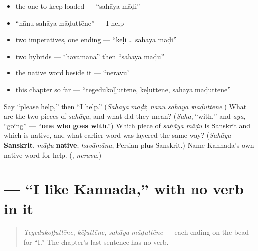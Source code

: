 \begin{itemize}
\raggedright
  \item the one to keep loaded — \textquotedblleft{}sahāya māḍi\textquotedblright{}
  \item \textquotedblleft{}nānu sahāya māḍuttēne\textquotedblright{} — I help
  \item two imperatives, one ending — \textquotedblleft{}kēḷi … sahāya māḍi\textquotedblright{}
  \item two hybrids — \textquotedblleft{}havāmāna\textquotedblright{} then \textquotedblleft{}sahāya māḍu\textquotedblright{}
  \item the native word beside it — \textquotedblleft{}neravu\textquotedblright{}
  \item this chapter so far — \textquotedblleft{}tegedukoḷḷuttēne, kēḷuttēne, sahāya māḍuttēne\textquotedblright{}
\end{itemize}

\begin{tcolorbox}[breakable,colback=teal!4,colframe=teal!35!black,title={Before you move on}]
Say \textquotedblleft{}please help,\textquotedblright{} then \textquotedblleft{}I help.\textquotedblright{} (\emph{Sahāya māḍi}; \emph{nānu sahāya māḍuttēne}.) What are the two pieces of \emph{sahāya}, and what did they mean? (\emph{Saha}, \textquotedblleft{}with,\textquotedblright{} and \emph{aya}, \textquotedblleft{}going\textquotedblright{} — \textquotedblleft{}\textbf{one who goes with}.\textquotedblright{}) Which piece of \emph{sahāya māḍu} is Sanskrit and which is native, and what earlier word was layered the same way? (\emph{Sahāya} \textbf{Sanskrit}, \emph{māḍu} \textbf{native}; \emph{havāmāna}, Persian plus Sanskrit.) Name Kannada's own native word for help. (\emph{\textbf{}}, \emph{neravu}.)
\end{tcolorbox}
\section[\texorpdfstring{\kn{ನನಗೆ} \kn{ಕನ್ನಡ} \kn{ಇಷ್ಟ} (nanage kannaḍa iṣṭa)}{ನನಗೆ ಕನ್ನಡ ಇಷ್ಟ (nanage kannaḍa iṣṭa)}]{   — \textquotedblleft{}I like Kannada,\textquotedblright{} with no verb in it}

\label{lesson:KA-C34-ishta}



\begin{quote}
\emph{Tegedukoḷḷuttēne}, \emph{kēḷuttēne}, \emph{sahāya māḍuttēne} — each ending on the bead for \textquotedblleft{}I.\textquotedblright{} The chapter's last sentence has no verb.
\end{quote}

